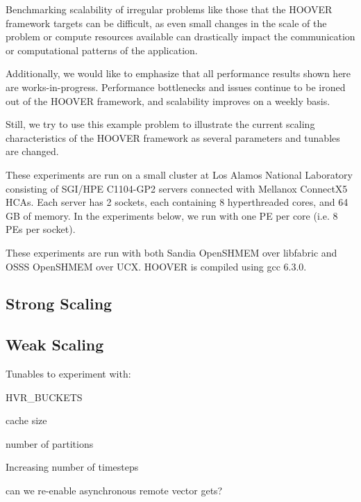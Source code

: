 Benchmarking scalability of irregular problems like those that the HOOVER
framework targets can be difficult, as even small changes in the scale of the
problem or compute resources available can drastically impact the communication
or computational patterns of the application.

Additionally, we would like to emphasize that all performance results shown here
are works-in-progress. Performance bottlenecks and issues continue to be ironed
out of the HOOVER framework, and scalability improves on a weekly basis.

Still, we try to use this example problem to illustrate the current scaling
characteristics of the HOOVER framework as several parameters and tunables are
changed.

These experiments are run on a small cluster at Los Alamos National Laboratory
consisting of SGI/HPE C1104-GP2 servers connected with Mellanox ConnectX5 HCAs.
Each server has 2 sockets, each containing 8 hyperthreaded cores, and 64 GB of
memory. In the experiments below, we run with one PE per core (i.e. 8 PEs per
socket).

These experiments are run with both Sandia OpenSHMEM over libfabric and OSSS
OpenSHMEM over UCX. HOOVER is compiled using gcc 6.3.0.

\subsection{Strong Scaling}



\subsection{Weak Scaling}

Tunables to experiment with:

HVR\_BUCKETS

cache size

number of partitions

Increasing number of timesteps

can we re-enable asynchronous remote vector gets?
